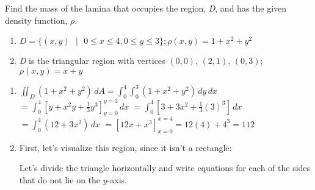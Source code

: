 \begin{Exercise}[title = {Finding Total Mass}, label = total_mass]
Find the mass of the lamina that occupies the region, \textit{D}, and has the 
given density function, $\rho$. 
\begin{enumerate}
\item $\textit{D} = \{(x, y)\text{ }|\text{ } 0 \leq x \leq 4, 0 \leq y \leq 3 
\}; \rho (x, y) = 1 + x^2 + y^2$
\item \textit{D} is the triangular region with vertices $(0, 0)$, $(2, 1)$, 
$(0, 3)$; $\rho (x, y) = x + y$
\end{enumerate}
\end{Exercise}

\begin{Answer}[ref = total_mass]
\begin{enumerate}
    \item $\iint_{\textit{D}} \left(1 + x^2 + y^2 \right)\,dA = \int_0^4 
    \int_0^3 \left( 1  + x^2 + y^2 \right)\,dy\,dx$ $= \int_0^4 \left[y + x^2y 
    + \frac{1}{3}y^3 \right]_{y = 0}^{y = 3}\,dx$ $= \int_0^4 \left[ 3 + 3x^2 
    + \frac{1}{3}(3)^3 \right]\,dx$ $= \int_0^4 \left(12 + 3x^2 \right)\,dx$ 
    $= \left[ 12x + x^3 \right]_{x = 0}^{x = 4} = 12(4) + 4^3 = 112$
    \item First, let's visualize this region, since it isn't a rectangle:
    

    Let's divide the triangle horizontally and write equations for each of the 
    sides that do not lie on the $y$-axis.



\end{enumerate}
\end{Answer}
